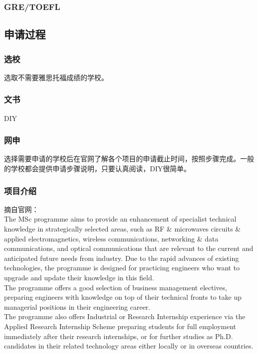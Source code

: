 \documentclass[a4paper,UTF8]{book}
\begin{document}
        \subsubsection*{GRE/TOEFL}

    \subsection*{申请过程}
        \subsubsection*{选校}
        选取不需要雅思托福成绩的学校。
        \subsubsection*{文书}
        DIY
        \subsubsection*{网申}
        选择需要申请的学校后在官网了解各个项目的申请截止时间，按照步骤完成。一般的学校都会提供申请步骤说明，只要认真阅读，DIY很简单。
        \subsubsection*{项目介绍}
        摘自官网：\\
        The MSc programme aims to provide an enhancement of specialist technical knowledge in strategically selected areas, such as RF \& microwaves circuits \& applied electromagnetics, wireless communications, networking \& data communications, and optical communications that are relevant to the current and anticipated future needs from industry. Due to the rapid advances of existing technologies, the programme is designed for practicing engineers who want to upgrade and update their knowledge in this field.\\
        The programme offers a good selection of business management electives, preparing engineers with knowledge on top of their technical fronts to take up managerial positions in their engineering career.\\
        The programme also offers Industrial or Research Internship experience via the Applied Research Internship Scheme preparing students for full employment immediately after their research internships, or for further studies as Ph.D. candidates in their related technology areas either locally or in overseas countries.
\end{document}
